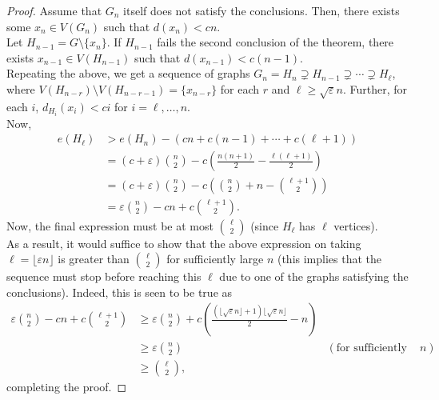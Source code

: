 			\begin{proof}
				Assume that $G_n$ itself does not satisfy the conclusions. Then, there exists some $x_n \in V(G_n)$ such that $d(x_n) < cn$.\\
				Let $H_{n-1} = G \setminus \{x_n\}$. If $H_{n-1}$ fails the second conclusion of the theorem, there exists $x_{n-1} \in V(H_{n-1})$ such that $d(x_{n-1}) < c (n-1)$.\\
				Repeating the above, we get a sequence of graphs $G_n = H_n \supsetneq H_{n-1} \supsetneq \cdots \supsetneq H_{\ell}$, where $V(H_{n-r}) \setminus V(H_{n-r-1}) = \{x_{n-r}\}$ for each $r$ and $\ell \ge \sqrt{\varepsilon} n$. Further, for each $i$, $d_{H_i}(x_i) < c i$ for $i = \ell,\ldots,n$.\\
				Now,
				\begin{align*}
					e(H_\ell) &> e(H_n) - \left(cn + c(n-1) + \cdots + c(\ell+1)\right) \\
					&= (c+\varepsilon)\binom{n}{2} - c \left(\frac{n(n+1)}{2} - \frac{\ell(\ell+1)}{2}\right) \\
					&= (c+\varepsilon)\binom{n}{2} - c \left(\binom{n}{2} + n - \binom{\ell+1}{2}\right) \\
					&= \varepsilon\binom{n}{2} - cn + c \binom{\ell+1}{2}.
				\end{align*}
				Now, the final expression must be at most $\binom{\ell}{2}$ (since $H_\ell$ has $\ell$ vertices).\\
				As a result, it would suffice to show that the above expression on taking $\ell = \lfloor \varepsilon n \rfloor$ is greater than $\binom{\ell}{2}$ for sufficiently large $n$ (this implies that the sequence must stop before reaching this $\ell$ due to one of the graphs satisfying the conclusions). Indeed, this is seen to be true as
				\begin{align*}
					\varepsilon\binom{n}{2} - cn + c\binom{\ell+1}{2} &\ge \varepsilon\binom{n}{2} + c\left(\frac{(\lfloor\sqrt{\varepsilon}n\rfloor+1)\lfloor\sqrt{\varepsilon}n\rfloor}{2} - n\right) \\
					&\ge \varepsilon\binom{n}{2} & (\text{for sufficiently large $n$}) \\
					&\ge \binom{\ell}{2},
				\end{align*}
				completing the proof.
			\end{proof}




